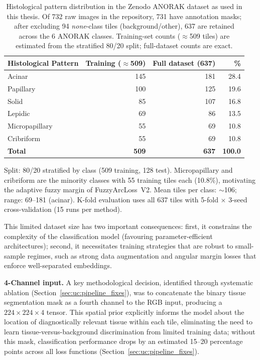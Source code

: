 \begin{table}[ht!]
\centering
\small
\caption{Histological pattern distribution in the Zenodo ANORAK
dataset as used in this thesis.
Of 732 raw images in the repository, 731 have annotation masks;
after excluding 94 \emph{none}-class tiles (background/other),
637 are retained across the 6 ANORAK classes.
Training-set counts ($\approx$509 tiles) are estimated from the
stratified 80/20 split; full-dataset counts are exact.}
\label{tab:dataset_config_anorak}
\begin{tabular}{l r r r}
\hline
\textbf{Histological Pattern} &
\textbf{Training ($\approx$509)} &
\textbf{Full dataset (637)} &
\textbf{\%} \\
\hline
Acinar         & 145 & 181 & 28.4 \\
Papillary      & 100 & 125 & 19.6 \\
Solid          &  85 & 107 & 16.8 \\
Lepidic        &  69 &  86 & 13.5 \\
Micropapillary &  55 &  69 & 10.8 \\
Cribriform     &  55 &  69 & 10.8 \\
\hline
\textbf{Total} & \textbf{509} & \textbf{637} & \textbf{100.0} \\
\hline
\end{tabular}
\begin{flushleft}
\footnotesize
Split: 80/20 stratified by class (509 training, 128 test).
Micropapillary and cribriform are the minority classes with 55
training tiles each (10.8\%), motivating the adaptive fuzzy margin
of FuzzyArcLoss~V2.
Mean tiles per class: $\sim$106; range: 69--181 (acinar).
K-fold evaluation uses all 637 tiles with 5-fold
$\times$ 3-seed cross-validation (15 runs per method).
\end{flushleft}
\end{table}

This limited dataset size has two important consequences: first, it
constrains the complexity of the classification model (favouring
parameter-efficient architectures); second, it necessitates training
strategies that are robust to small-sample regimes, such as strong data
augmentation and angular margin losses that enforce well-separated
embeddings.

\textbf{4-Channel input.}
A key methodological decision, identified through systematic ablation
(Section~\ref{sec:uc:pipeline_fixes}), was to concatenate the binary
tissue segmentation mask as a fourth channel to the RGB input, producing
a $224 \times 224 \times 4$ tensor.
This spatial prior explicitly informs the model about the location of
diagnostically relevant tissue within each tile, eliminating the need to
learn tissue-versus-background discrimination from limited training data;
without this mask, classification performance drops by an estimated
15--20 percentage points across all loss functions
(Section~\ref{sec:uc:pipeline_fixes}).


